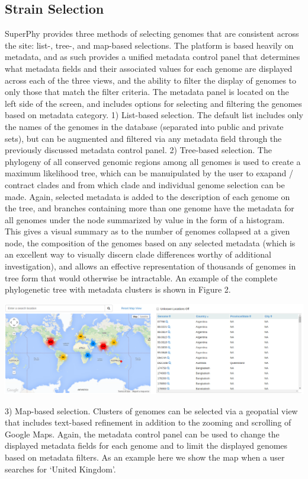 \documentclass{bmcart}
\begin{document}
\subsection{Strain Selection}
SuperPhy provides three methods of selecting genomes that are consistent across the site: list-, tree-, and map-based selections. The platform is based heavily on metadata, and as such provides a unified metadata control panel that determines what metadata fields and their associated values for each genome are displayed across each of the three views, and the ability to filter the display of genomes to only those that match the filter criteria. The metadata panel is located on the left side of the screen, and includes options for selecting and filtering the genomes based on metadata category.
 1) List-based selection. The default list includes only the names of the genomes in the database (separated into public and private sets), but can be augmented and filtered via any metadata field through the previously discussed metadata control panel.
 2) Tree-based selection. The phylogeny of all conserved genomic regions among all genomes is used to create a maximum likelihood tree, which can be manuipulated by the user to exapand / contract clades and from which clade and individual genome selection can be made. Again, selected metadata is added to the description of each genome on the tree, and branches containing more than one genome have the metadata for all genomes under the node summarized by value in the form of a histogram. This gives a visual summary as to the number of genomes collapsed at a given node, the composition of the genomes based on any selected metadata (which is an excellent way to visually discern clade differences worthy of additional investigation), and allows an effective representation of thousands of genomes in tree form that would otherwise be intractable. An example of the complete phylogenetic tree with metadata clusters is shown in Figure 2.

\includegraphics[width=\textwidth]{images/map.png}

 3) Map-based selection. Clusters of genomes can be selected via a geopatial view that includes text-based refinement in addition to the zooming and scrolling of Google Maps. Again, the metadata control panel can be used to change the displayed metadata fields for each genome and to limit the displayed genomes based on metadata filters. As an example here we show the map when a user searches for `United Kingdom'.
\end{document}
